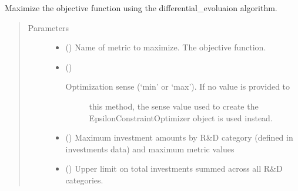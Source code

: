 \documentclass[letterpaper,10pt,english]{sphinxmanual}
\begin{document}
\begin{fulllineitems}
\begin{fulllineitems}
\begin{quote}
\begin{description}
\end{description}\end{quote}

\end{fulllineitems}


\begin{fulllineitems}
\label{\detokenize{doc-src/tyche:tyche.EpsilonConstraints.EpsilonConstraintOptimizer.opt_diffev}}
Maximize the objective function using the differential\_evoluaion algorithm.
\begin{quote}\begin{description}
\item[{Parameters}] \leavevmode\begin{itemize}
\item {} 
 () \textendash{} Name of metric to maximize. The objective function.

\item {} 
 () \textendash{} \begin{description}
\item[{Optimization sense (‘min’ or ‘max’). If no value is provided to}] \leavevmode
this method, the sense value used to create the
EpsilonConstraintOptimizer object is used instead.

\end{description}


\item {} 
 () \textendash{} Maximum investment amounts by R\&D category (defined in investments data)
and maximum metric values

\item {} 
 () \textendash{} Upper limit on total investments summed across all R\&D categories.


\end{itemize}
\end{description}
\end{quote}
\end{fulllineitems}
\end{fulllineitems}
\end{document}
